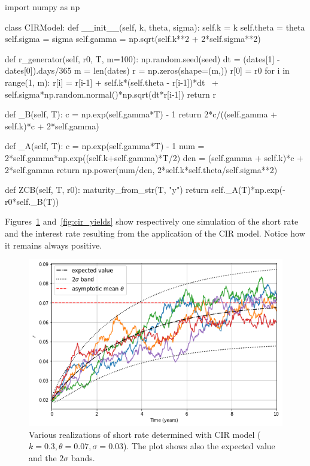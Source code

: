 \begin{ipython}
import numpy as np

class CIRModel:
    def __init__(self, k, theta, sigma):
        self.k = k
        self.theta = theta
        self.sigma = sigma
        self.gamma = np.sqrt(self.k**2 + 2*self.sigma**2)

    def r_generator(self, r0, T, m=100):
        np.random.seed(seed)
        dt = (dates[1] - dates[0]).days/365
        m = len(dates)
        r = np.zeros(shape=(m,))
        r[0] = r0
        for i in range(1, m):
            r[i] = r[i-1] + self.k*(self.theta - r[i-1])*dt \
                   + self.sigma*np.random.normal()*np.sqrt(dt*r[i-1])
        return r

    def _B(self, T):
        c = np.exp(self.gamma*T) - 1
        return 2*c/((self.gamma + self.k)*c + 2*self.gamma)

    def _A(self, T):
        c = np.exp(self.gamma*T) - 1
        num = 2*self.gamma*np.exp((self.k+self.gamma)*T/2)
        den = (self.gamma + self.k)*c + 2*self.gamma
        return np.power(num/den, 2*self.k*self.theta/self.sigma**2)

    def ZCB(self, T, r0):
        maturity_from_str(T, "y")
        return self._A(T)*np.exp(-r0*self._B(T))
\end{ipython}

Figures~\ref{fig:cir_path} and~\ref{fig:cir_yields} show respectively one simulation of the short rate and the interest rate resulting from the application of the CIR model. Notice how it remains always positive.

\begin{figure}[htb]
\centering
\includegraphics[width=0.7\linewidth]{figures/cir_short_rate}
\caption{Various realizations of short rate determined with CIR model ($k=0.3, \theta=0.07, \sigma=0.03$). The plot shows also the expected value and the $2\sigma$ bands.}
\label{fig:cir_path}
\end{figure}

